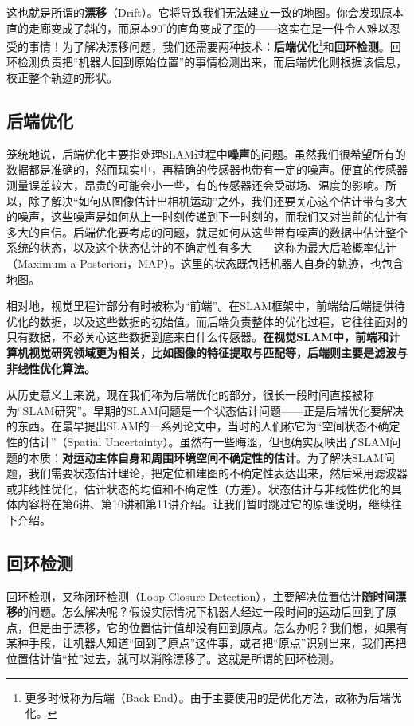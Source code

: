 这也就是所谓的\textbf{漂移}（Drift）。它将导致我们无法建立一致的地图。你会发现原本直的走廊变成了斜的，而原本$90^\circ$的直角变成了歪的——这实在是一件令人难以忍受的事情！为了解决漂移问题，我们还需要两种技术：\textbf{后端优化}\footnote{更多时候称为后端（Back End）。由于主要使用的是优化方法，故称为后端优化。}和\textbf{回环检测}。回环检测负责把“机器人回到原始位置”的事情检测出来，而后端优化则根据该信息，校正整个轨迹的形状。

\subsection{后端优化}
笼统地说，后端优化主要指处理SLAM过程中\textbf{噪声}的问题。虽然我们很希望所有的数据都是准确的，然而现实中，再精确的传感器也带有一定的噪声。便宜的传感器测量误差较大，昂贵的可能会小一些，有的传感器还会受磁场、温度的影响。所以，除了解决“如何从图像估计出相机运动”之外，我们还要关心这个估计带有多大的噪声，这些噪声是如何从上一时刻传递到下一时刻的，而我们又对当前的估计有多大的自信。后端优化要考虑的问题，就是如何从这些带有噪声的数据中估计整个系统的状态，以及这个状态估计的不确定性有多大——这称为最大后验概率估计（Maximum-a-Posteriori，MAP）。这里的状态既包括机器人自身的轨迹，也包含地图。

相对地，视觉里程计部分有时被称为“前端”。在SLAM框架中，前端给后端提供待优化的数据，以及这些数据的初始值。而后端负责整体的优化过程，它往往面对的只有数据，不必关心这些数据到底来自什么传感器。\textbf{在视觉SLAM中，前端和计算机视觉研究领域更为相关，比如图像的特征提取与匹配等，后端则主要是滤波与非线性优化算法。}

从历史意义上来说，现在我们称为后端优化的部分，很长一段时间直接被称为“SLAM研究”。早期的SLAM问题是一个状态估计问题——正是后端优化要解决的东西。在最早提出SLAM的一系列论文中，当时的人们称它为“空间状态不确定性的估计”（Spatial Uncertainty）\textsuperscript{\cite{Smith1986, Smith1990}}。虽然有一些晦涩，但也确实反映出了SLAM问题的本质：\textbf{对运动主体自身和周围环境空间不确定性的估计}。为了解决SLAM问题，我们需要状态估计理论，把定位和建图的不确定性表达出来，然后采用滤波器或非线性优化，估计状态的均值和不确定性（方差）。状态估计与非线性优化的具体内容将在第6讲、第10讲和第11讲介绍。让我们暂时跳过它的原理说明，继续往下介绍。

\subsection{回环检测}

回环检测，又称闭环检测（Loop Closure Detection），主要解决位置估计\textbf{随时间漂移}的问题。怎么解决呢？假设实际情况下机器人经过一段时间的运动后回到了原点，但是由于漂移，它的位置估计值却没有回到原点。怎么办呢？我们想，如果有某种手段，让机器人知道“回到了原点”这件事，或者把“原点”识别出来，我们再把位置估计值“拉”过去，就可以消除漂移了。这就是所谓的回环检测。

